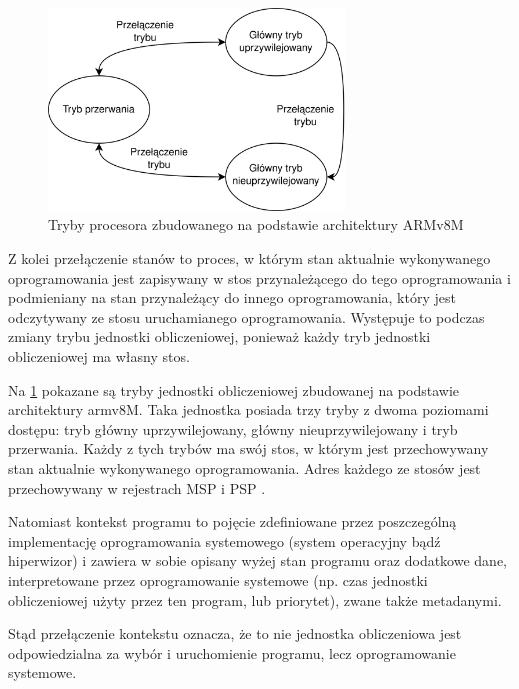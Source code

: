 \documentclass[../main]{subfiles}
\begin{document}
\begin{figure}[ht]
    \centering
    \includegraphics[width=0.7\textwidth]{Images/armv8m-modes.png}
    \caption{Tryby procesora zbudowanego na podstawie architektury ARMv8M
    \cite{armv8mintro}}
    \label{fig:armv8-m-modes}
\end{figure}

Z kolei przełączenie stanów to proces, w którym stan aktualnie wykonywanego oprogramowania jest zapisywany w stos przynależącego do tego oprogramowania i podmieniany na stan przynależący do innego oprogramowania, który jest odczytywany ze stosu uruchamianego oprogramowania. Występuje to podczas zmiany trybu jednostki obliczeniowej, ponieważ każdy tryb jednostki obliczeniowej ma własny stos.

Na \cref{fig:armv8-m-modes} pokazane są tryby jednostki obliczeniowej zbudowanej na podstawie architektury \gls{arm}v8M. Taka jednostka posiada trzy tryby z dwoma poziomami  dostępu: tryb główny uprzywilejowany, główny nieuprzywilejowany i tryb przerwania. Każdy z tych trybów ma swój stos, w którym jest przechowywany stan aktualnie wykonywanego oprogramowania. Adres każdego ze stosów jest przechowywany w rejestrach MSP i PSP \cite{armv8mintro}.

Natomiast kontekst programu to pojęcie zdefiniowane przez poszczególną implementację oprogramowania systemowego (system operacyjny bądź hiperwizor) i zawiera w sobie opisany wyżej stan programu oraz dodatkowe dane, interpretowane przez oprogramowanie systemowe (np. czas jednostki obliczeniowej użyty przez ten program, lub priorytet), zwane także metadanymi.

Stąd przełączenie kontekstu oznacza, że to nie jednostka obliczeniowa jest odpowiedzialna za wybór i uruchomienie programu, lecz oprogramowanie systemowe.
\end{document}
